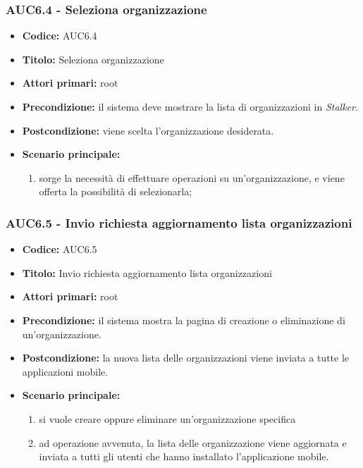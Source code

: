 \documentclass[casi-duso]{subfiles}
\begin{document}
\subsubsection{AUC6.4 - Seleziona organizzazione}%
\label{subsub:AUC6.4}
\begin{itemize}
  \item \textbf{Codice:} AUC6.4
  \item \textbf{Titolo:} Seleziona organizzazione
  \item \textbf{Attori primari:} root
  \item \textbf{Precondizione:} il sistema deve mostrare la lista di organizzazioni in \emph{Stalker}.
  \item \textbf{Postcondizione:} viene scelta l'organizzazione desiderata.
  \item \textbf{Scenario principale:}
  \begin{enumerate}
    \item sorge la necessità di effettuare operazioni su un'organizzazione, e viene offerta la possibilità di selezionarla;
  \end{enumerate}
\end{itemize}

\subsubsection{AUC6.5 - Invio richiesta aggiornamento lista organizzazioni}%
\label{subsub:AUC6.5}
\begin{itemize}
  \item \textbf{Codice:} AUC6.5
  \item \textbf{Titolo:} Invio richiesta aggiornamento lista organizzazioni
  \item \textbf{Attori primari:} root
  \item \textbf{Precondizione:} il sistema mostra la pagina di creazione o eliminazione di un'organizzazione.
  \item \textbf{Postcondizione:} la nuova lista delle organizzazioni viene inviata a tutte le applicazioni mobile.
  \item \textbf{Scenario principale:}
  \begin{enumerate}
    \item si vuole creare oppure eliminare un'organizzazione specifica
    \item ad operazione avvenuta, la lista delle organizzazione viene aggiornata e inviata a tutti gli utenti che hanno installato l'applicazione mobile.
  \end{enumerate}
\end{itemize}
\end{document}
